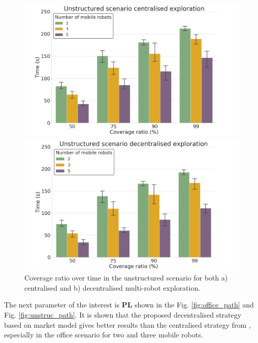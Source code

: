 \documentclass[letterpaper, 10 pt, conference]{ieeeconf}  %
\begin{document}
\begin{figure}[!h]
	\centering
	\begin{minipage}[c]{0.5\textwidth}
		\centering
		\includegraphics[width=\textwidth]{unstructured_c_cent.png}
		\captionsetup{labelformat=empty}
		\caption*{}
		\label{fig:unstructured1}
	\end{minipage}%
	\begin{minipage}[c]{0.50\textwidth}
		\centering
		\includegraphics[width=\textwidth]{unstructured_c_decent.png}
		\captionsetup{labelformat=empty}
		\caption*{}
		\label{fig:unstructured2}
	\end{minipage}
 \caption{Coverage ratio over time in the unstructured scenario for both a) centralised and b) decentralised multi-robot exploration.}
 \label{fig:unstructured_coverage}
\end{figure}


The next parameter of the interest is \textbf{PL} shown in the Fig. \ref{fig:office_path} and Fig. \ref{fig:unstruc_path}. It is shown that the proposed decentralised strategy based on market model gives better results than the centralised strategy from \cite{burgard}, especially in the office scenario for two and three mobile robots. 
\end{document}
